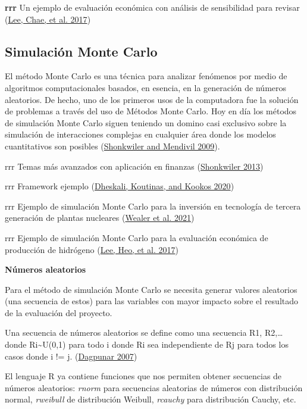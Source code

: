 \documentclass[
]{book}
\begin{document}
\textbf{rrr} Un ejemplo de evaluación económica con análisis de sensibilidad para revisar (\protect\hyperlink{ref-Lee2017}{Lee, Chae, et al. 2017})

\newpage

\hypertarget{simulaciuxf3n-monte-carlo}{%
\subsection{Simulación Monte Carlo}\label{simulaciuxf3n-monte-carlo}}

El método Monte Carlo es una técnica para analizar fenómenos por medio de algoritmos computacionales basados, en esencia, en la generación de números aleatorios. De hecho, uno de los primeros usos de la computadora fue la solución de problemas a través del uso de Métodos Monte Carlo. Hoy en día los métodos de simulación Monte Carlo siguen teniendo un domino casi exclusivo sobre la simulación de interacciones complejas en cualquier área donde los modelos cuantitativos son posibles (\protect\hyperlink{ref-Shonkwiler2009}{Shonkwiler and Mendivil 2009}).

rrr Temas más avanzados con aplicación en finanzas (\protect\hyperlink{ref-Shonkwiler2013}{Shonkwiler 2013})

rrr Framework ejemplo (\protect\hyperlink{ref-Dheskali2020}{Dheskali, Koutinas, and Kookos 2020})

rrr Ejemplo de simulación Monte Carlo para la inversión en tecnología de tercera generación de plantas nucleares (\protect\hyperlink{ref-Wealer2021}{Wealer et al. 2021})

rrr Ejemplo de simulación Monte Carlo para la evaluación económica de producción de hidrógeno (\protect\hyperlink{ref-Lee2017economic}{Lee, Heo, et al. 2017})

\textbf{Números aleatorios}

Para el método de simulación Monte Carlo se necesita generar valores aleatorios (una secuencia de estos) para las variables con mayor impacto sobre el resultado de la evaluación del proyecto.

Una secuencia de números aleatorios se define como una secuencia R1, R2,\ldots{} donde Ri\textasciitilde U(0,1) para todo i donde Ri sea independiente de Rj para todos los casos donde i != j. (\protect\hyperlink{ref-Dagpunar2007}{Dagpunar 2007})

El lenguaje R ya contiene funciones que nos permiten obtener secuencias de números aleatorios: \emph{rnorm} para secuencias aleatorias de números con distribución normal, \emph{rweibull} de distribución Weibull, \emph{rcauchy} para distribución Cauchy, etc.
\end{document}
